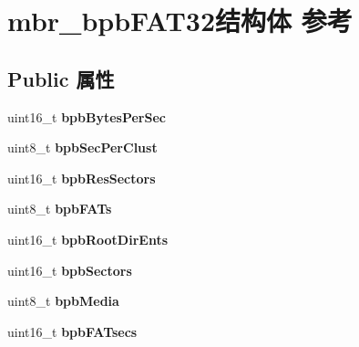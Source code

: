 \hypertarget{structmbr__bpb_f_a_t32}{}\section{mbr\+\_\+bpb\+F\+A\+T32结构体 参考}
\label{structmbr__bpb_f_a_t32}
\subsection*{Public 属性}
\begin{DoxyCompactItemize}
\item 
\mbox{\label{structmbr__bpb_f_a_t32_a2fcc65cd2398ba0ffc5dcd9d196c4478}} 
uint16\+\_\+t {\bfseries bpb\+Bytes\+Per\+Sec}
\item 
\mbox{\label{structmbr__bpb_f_a_t32_a573de4f4b15f77c854ee51ad290943ef}} 
uint8\+\_\+t {\bfseries bpb\+Sec\+Per\+Clust}
\item 
\mbox{\label{structmbr__bpb_f_a_t32_acfae5b9c8fcd5e4301ca915eb9b3230f}} 
uint16\+\_\+t {\bfseries bpb\+Res\+Sectors}
\item 
\mbox{\label{structmbr__bpb_f_a_t32_a5c811c8d9fb1ba56365c6aa53b252135}} 
uint8\+\_\+t {\bfseries bpb\+F\+A\+Ts}
\item 
\mbox{\label{structmbr__bpb_f_a_t32_a2012fca47b6c6679c411baa3b82043ca}} 
uint16\+\_\+t {\bfseries bpb\+Root\+Dir\+Ents}
\item 
\mbox{\label{structmbr__bpb_f_a_t32_a5a446dd33a0797c0f442ae9f8037eb74}} 
uint16\+\_\+t {\bfseries bpb\+Sectors}
\item 
\mbox{\label{structmbr__bpb_f_a_t32_a124be480c5fde4a4721fa4a79c993fab}} 
uint8\+\_\+t {\bfseries bpb\+Media}
\item 
\mbox{\label{structmbr__bpb_f_a_t32_ab54a212f0269b1eac0c2922178ec06e0}} 
uint16\+\_\+t {\bfseries bpb\+F\+A\+Tsecs}
\item 
\mbox{\label{structmbr__bpb_f_a_t32_a08dc2cb8c29820e2bac49e7b57b6e70c}} 

\end{DoxyCompactItemize}
